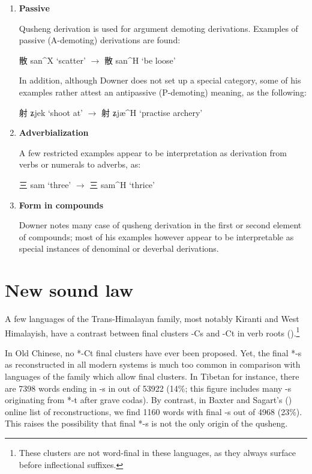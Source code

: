\documentclass[oldfontcommands,oneside,a4paper,11pt]{article}
\newcommand{\ipa}[1]{{\phon \mbox{#1}}} %
\newcommand{\zh}[1]{{\cn #1}}
\newcommand{\ch}[3]{\zh{#1} \ipa{#2} `#3'}
\begin{document}
\begin{enumerate}
\item \textbf{Passive}

Qusheng derivation is used for argument demoting derivations. Examples of passive (A-demoting) derivations are found:

\ch{散}{san^X}{scatter} $\rightarrow$ \ch{散}{san^H}{be loose} 

In addition, although Downer does not set up a special category, some of his examples rather attest an antipassive (P-demoting) meaning, as the following:

\ch{射}{ʑjek}{shoot at} $\rightarrow$ \ch{射}{ʑjæ^H}{practise archery} 

\item \textbf{Adverbialization}

A few restricted examples appear to be interpretation as derivation from verbs or numerals to adverbs, as:

\ch{三}{sam}{three} $\rightarrow$ \ch{三}{sam^H}{thrice} 

\item \textbf{Form in compounds}

Downer notes many case of qusheng derivation in the first or second element of compounds; most of his examples however appear to be interpretable as special instances of denominal or deverbal derivations.
\end{enumerate}

\section{New sound law}
A few languages of the Trans-Himalayan family, most notably Kiranti and West Himalayish, have a contrast between final clusters -Cs and -Ct in verb roots (\citealt{michailovsky85dental}).\footnote{These clusters are not word-final in these languages, as they always surface before inflectional suffixes.} 

In Old Chinese, no *-Ct final clusters have ever been proposed. Yet, the final *-s as reconstructed in all modern systems is much too common in comparison with languages of the family which allow final clusters. In Tibetan for instance, there are 7398 words ending in -s in  \citet{bodrgya} out of 53922 (14\%; this figure includes many -s originating from *\ipa{-t} after grave codas). By contrast, in Baxter and Sagart's (\citeyear{bs14oc}) online list of reconstructions, we find 1160 words with final -s out of 4968 (23\%). This raises the possibility that final *-s is not the only origin of the qusheng.
\end{document}
